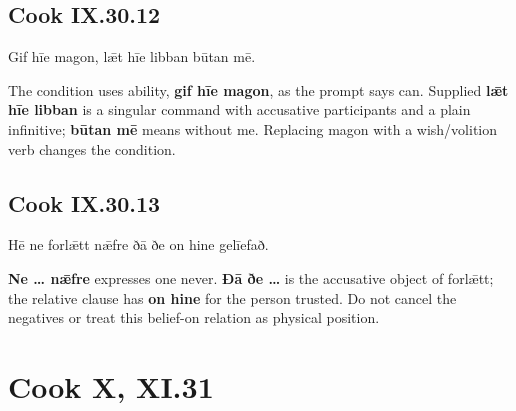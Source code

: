 \subsection*{Cook IX.30.12}

\par\begin{minipage}{\linewidth}\raggedright
Gif hīe magon, lǣt hīe libban būtan mē.

The condition uses ability, \textbf{gif hīe magon}, as the prompt says can. Supplied \textbf{lǣt hīe libban} is a singular command with accusative participants and a plain infinitive; \textbf{būtan mē} means without me. Replacing magon with a wish/\allowbreak{}volition verb changes the condition.

\end{minipage}\par\addvspace{4pt}

\subsection*{Cook IX.30.13}

\par\begin{minipage}{\linewidth}\raggedright
Hē ne forlǣtt nǣfre ðā ðe on hine gelīefað.

\textbf{Ne … nǣfre} expresses one never. \textbf{Ðā ðe …} is the accusative object of forlǣtt; the relative clause has \textbf{on hine} for the person trusted. Do not cancel the negatives or treat this belief-on relation as physical position.

\end{minipage}\par\addvspace{4pt}

\section*{Cook X, XI.31}

